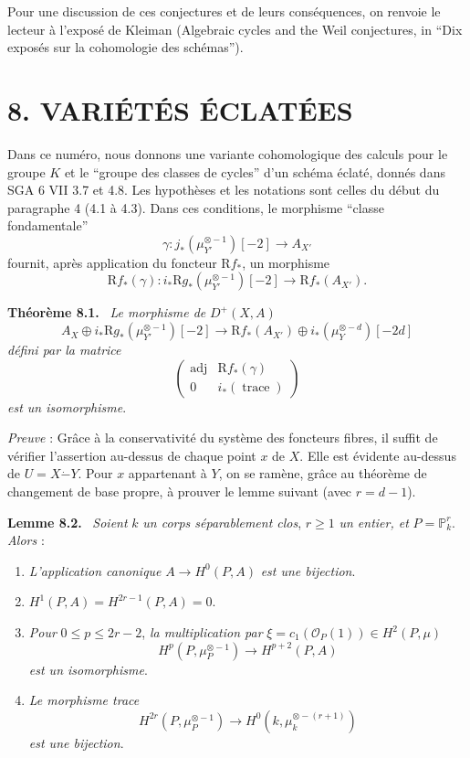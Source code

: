 \documentclass[11pt]{article}
\newenvironment{statement}[1]{\par\medskip\noindent\textbf{#1.}\ }{\par\medskip}
\newcommand{\R}{\mathrm{R}}\newcommand{\RHomCore}{\mathrm{RHom}}
\providecommand{\R}{\mathrm R}
\begin{document}
Pour une discussion de ces conjectures et de leurs conséquences, on renvoie le lecteur à l'exposé de Kleiman (Algebraic cycles and the Weil conjectures, in ``Dix exposés sur la cohomologie des schémas'').

\section*{8. VARIÉTÉS ÉCLATÉES}

Dans ce numéro, nous donnons une variante cohomologique des calculs pour le groupe $K$ et le ``groupe des classes de cycles'' d'un schéma éclaté, donnés dans SGA 6 VII 3.7 et 4.8. Les hypothèses et les notations sont celles du début du paragraphe 4 (4.1 à 4.3). Dans ces conditions, le morphisme ``classe fondamentale''
\[
\gamma:j_*(\mu_{Y'}^{\otimes -1})[-2]\to A_{X'}
\]
fournit, après application du foncteur $\R f_*$, un morphisme
\[
\R f_*(\gamma):i_*\R g_*(\mu_{Y'}^{\otimes -1})[-2]\to \R f_*(A_{X'}).
\]

\begin{statement}{Théorème 8.1}
\emph{Le morphisme de} $D^+(X,A)$
\[
A_X\oplus i_*\R g_*(\mu_{Y'}^{\otimes -1})[-2]\to
\R f_*(A_{X'})\oplus i_*(\mu_Y^{\otimes -d})[-2d]
\tag{8.1.1}
\]
\emph{défini par la matrice}
\[
\begin{pmatrix}
\operatorname{adj}&\R f_*(\gamma)\\
0&i_*(\operatorname{trace})
\end{pmatrix}
\]
\emph{est un isomorphisme}.
\end{statement}

\emph{Preuve} : Grâce à la conservativité du système des foncteurs fibres, il suffit de vérifier l'assertion au-dessus de chaque point $x$ de $X$. Elle est évidente au-dessus de $U=X\mathbin{\dot{-}}Y$. Pour $x$ appartenant à $Y$, on se ramène, grâce au théorème de changement de base propre, à prouver le lemme suivant (avec $r=d-1$).

\begin{statement}{Lemme 8.2}
\emph{Soient} $k$ \emph{un corps séparablement clos}, $r\ge1$ \emph{un entier, et} $P=\mathbb P_k^r$. \emph{Alors} :
\begin{enumerate}[label=\alph*)]
\item \emph{L'application canonique} $A\to H^0(P,A)$ \emph{est une bijection}.
\item $H^1(P,A)=H^{2r-1}(P,A)=0$.
\item
\emph{Pour} $0\le p\le2r-2$, \emph{la multiplication par} $\xi=c_1(\mathcal O_P(1))\in H^2(P,\mu)$
\[
H^p(P,\mu_P^{\otimes -1})\to H^{p+2}(P,A)
\]
\emph{est un isomorphisme}.
\item \emph{Le morphisme trace}
\[
H^{2r}(P,\mu_P^{\otimes -1})\to H^0(k,\mu_k^{\otimes -(r+1)})
\]
\emph{est une bijection}.
\end{enumerate}
\end{statement}
\end{document}
